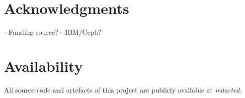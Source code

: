 \section*{Acknowledgments}

- Funding source?
- IBM/Ceph?

\section*{Availability}

All source code and artefacts of this project are publicly available at
\textit{redacted}.
